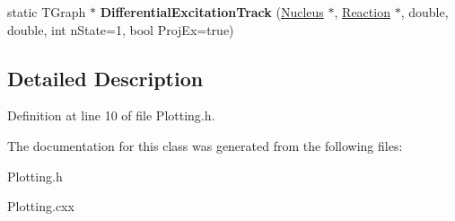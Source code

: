 \begin{DoxyCompactItemize}
\item 
\hypertarget{classPlotting_ad5ca78a0dbe4ad43259c6c5dcd50614a}{static T\-Graph $\ast$ {\bfseries Differential\-Excitation\-Track} (\hyperlink{classNucleus}{Nucleus} $\ast$, \hyperlink{classReaction}{Reaction} $\ast$, double, double, int n\-State=1, bool Proj\-Ex=true)}\label{classPlotting_ad5ca78a0dbe4ad43259c6c5dcd50614a}

\end{DoxyCompactItemize}


\subsection{Detailed Description}


Definition at line 10 of file Plotting.\-h.



The documentation for this class was generated from the following files\-:\begin{DoxyCompactItemize}
\item 
Plotting.\-h\item 
Plotting.\-cxx\end{DoxyCompactItemize}
